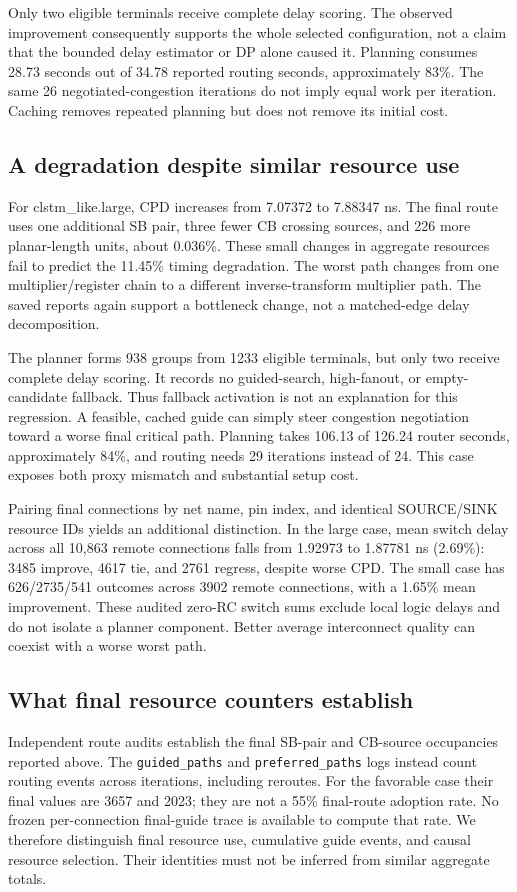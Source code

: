 \documentclass[conference,10pt]{IEEEtran}
\begin{document}
Only two eligible terminals receive complete delay scoring. The observed improvement consequently supports the whole selected configuration, not a claim that the bounded delay estimator or DP alone caused it. Planning consumes 28.73 seconds out of 34.78 reported routing seconds, approximately 83\%. The same 26 negotiated-congestion iterations do not imply equal work per iteration. Caching removes repeated planning but does not remove its initial cost.

\subsection{A degradation despite similar resource use}
For clstm\_like.large, CPD increases from 7.07372 to 7.88347 ns. The final route uses one additional SB pair, three fewer CB crossing sources, and 226 more planar-length units, about 0.036\%. These small changes in aggregate resources fail to predict the 11.45\% timing degradation. The worst path changes from one multiplier/register chain to a different inverse-transform multiplier path. The saved reports again support a bottleneck change, not a matched-edge delay decomposition.

The planner forms 938 groups from 1233 eligible terminals, but only two receive complete delay scoring. It records no guided-search, high-fanout, or empty-candidate fallback. Thus fallback activation is not an explanation for this regression. A feasible, cached guide can simply steer congestion negotiation toward a worse final critical path. Planning takes 106.13 of 126.24 router seconds, approximately 84\%, and routing needs 29 iterations instead of 24. This case exposes both proxy mismatch and substantial setup cost.

Pairing final connections by net name, pin index, and identical SOURCE/SINK resource IDs yields an additional distinction. In the large case, mean switch delay across all 10,863 remote connections falls from 1.92973 to 1.87781 ns (2.69\%): 3485 improve, 4617 tie, and 2761 regress, despite worse CPD. The small case has 626/2735/541 outcomes across 3902 remote connections, with a 1.65\% mean improvement. These audited zero-RC switch sums exclude local logic delays and do not isolate a planner component. Better average interconnect quality can coexist with a worse worst path.

\subsection{What final resource counters establish}
Independent route audits establish the final SB-pair and CB-source occupancies reported above. The \texttt{guided\_paths} and \texttt{preferred\_paths} logs instead count routing events across iterations, including reroutes. For the favorable case their final values are 3657 and 2023; they are not a 55\% final-route adoption rate. No frozen per-connection final-guide trace is available to compute that rate. We therefore distinguish final resource use, cumulative guide events, and causal resource selection. Their identities must not be inferred from similar aggregate totals.
\end{document}
